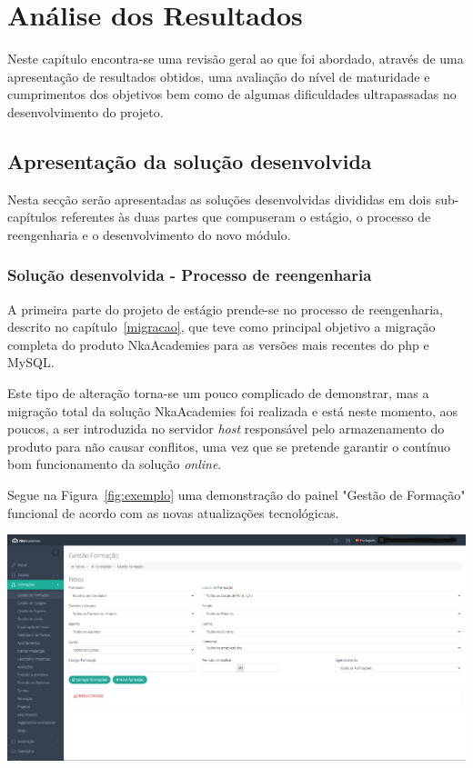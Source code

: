 
\chapter{Análise dos Resultados}
\label{analise}

Neste capítulo encontra-se uma revisão geral ao que foi abordado, através de uma apresentação de resultados obtidos, uma avaliação do nível de maturidade e cumprimentos dos objetivos bem como de algumas dificuldades ultrapassadas no desenvolvimento do projeto.

\section{Apresentação da solução desenvolvida}
\label{app}

Nesta secção serão apresentadas as soluções desenvolvidas divididas em dois sub-capítulos referentes às duas partes que compuseram o estágio, o processo de reengenharia e o desenvolvimento do novo módulo.

\subsection{Solução desenvolvida - Processo de reengenharia}

A primeira parte do projeto de estágio prende-se no processo de reengenharia, descrito no capítulo~\ref{migracao}, que teve como principal objetivo a migração completa do produto NkaAcademies para as versões mais recentes do \acrshort{php} e MySQL.

Este tipo de alteração torna-se um pouco complicado de demonstrar, mas a migração total da solução NkaAcademies foi realizada e está neste momento, aos poucos, a ser introduzida no servidor \textit{host} responsável pelo armazenamento do produto para não causar conflitos, uma vez que se pretende garantir o contínuo bom funcionamento da solução \textit{online}.

Segue na Figura~\ref{fig:exemplo} uma demonstração do painel "Gestão de Formação"  funcional de acordo com as novas atualizações tecnológicas.

\begin{center}
        \includegraphics[width=\textwidth,height=\textheight,keepaspectratio]{images/Exemplo.png}
        \label{fig:exemplo}
\end{center}

